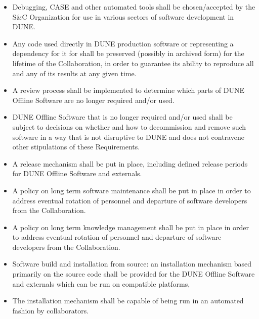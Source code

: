 \begin{itemize}
\item Debugging, CASE and other automated tools shall be chosen/accepted by the S\&C Organization for use in various sectors of software development in DUNE.

\item Any code used directly in DUNE production software or representing a dependency for it for shall be preserved (possibly in archived form) for the lifetime of the Collaboration, in order to guarantee its ability to reproduce all and any of its results at any given time.


\item A review process shall be implemented to determine which parts of DUNE Offline Software are no longer required and/or used.

\item DUNE Offline Software that is no longer required and/or used shall be subject to decisions on whether and how to decommission and remove such software in a way that is not disruptive to DUNE and does not contravene other stipulations of these Requirements.

\item A release mechanism shall be put in place, including defined release periods for DUNE Offline Software and externals.

\item A policy on long term software maintenance shall be put in place in order to address eventual rotation of personnel and departure of software developers from the Collaboration.

\item A policy on long term knowledge management shall be put in place in order to address eventual rotation of personnel and departure of software developers from the Collaboration.

\item Software build and installation from source: an installation mechanism based primarily on the source code shall be provided for the DUNE Offline Software and externals which can be run on compatible platforms, 

\item The installation mechanism shall be capable of being run in an automated fashion by collaborators.


\end{itemize}
